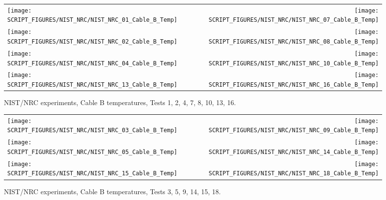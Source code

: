 \begin{figure}[p]
\begin{tabular*}{\textwidth}{l@{\extracolsep{\fill}}r}
\texttt{[image: SCRIPT\_FIGURES/NIST\_NRC/NIST\_NRC\_01\_Cable\_B\_Temp]} &
\texttt{[image: SCRIPT\_FIGURES/NIST\_NRC/NIST\_NRC\_07\_Cable\_B\_Temp]} \\
\texttt{[image: SCRIPT\_FIGURES/NIST\_NRC/NIST\_NRC\_02\_Cable\_B\_Temp]} &
\texttt{[image: SCRIPT\_FIGURES/NIST\_NRC/NIST\_NRC\_08\_Cable\_B\_Temp]} \\
\texttt{[image: SCRIPT\_FIGURES/NIST\_NRC/NIST\_NRC\_04\_Cable\_B\_Temp]} &
\texttt{[image: SCRIPT\_FIGURES/NIST\_NRC/NIST\_NRC\_10\_Cable\_B\_Temp]} \\
\texttt{[image: SCRIPT\_FIGURES/NIST\_NRC/NIST\_NRC\_13\_Cable\_B\_Temp]} &
\texttt{[image: SCRIPT\_FIGURES/NIST\_NRC/NIST\_NRC\_16\_Cable\_B\_Temp]}
\end{tabular*}
\caption{NIST/NRC experiments, Cable B temperatures, Tests 1, 2, 4, 7, 8, 10, 13, 16.}
\label{NIST_NRC_Cable_B_Closed}
\end{figure}

\begin{figure}[p]
\begin{tabular*}{\textwidth}{l@{\extracolsep{\fill}}r}
\texttt{[image: SCRIPT\_FIGURES/NIST\_NRC/NIST\_NRC\_03\_Cable\_B\_Temp]} &
\texttt{[image: SCRIPT\_FIGURES/NIST\_NRC/NIST\_NRC\_09\_Cable\_B\_Temp]} \\
\texttt{[image: SCRIPT\_FIGURES/NIST\_NRC/NIST\_NRC\_05\_Cable\_B\_Temp]} &
\texttt{[image: SCRIPT\_FIGURES/NIST\_NRC/NIST\_NRC\_14\_Cable\_B\_Temp]} \\
\texttt{[image: SCRIPT\_FIGURES/NIST\_NRC/NIST\_NRC\_15\_Cable\_B\_Temp]} &
\texttt{[image: SCRIPT\_FIGURES/NIST\_NRC/NIST\_NRC\_18\_Cable\_B\_Temp]}
\end{tabular*}
\caption{NIST/NRC experiments, Cable B temperatures, Tests 3, 5, 9, 14, 15, 18.}
\label{NIST_NRC_Cable_B_Open}
\end{figure}

